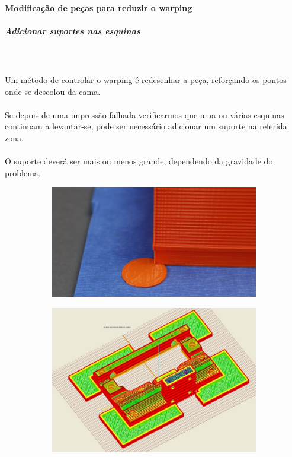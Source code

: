 \documentclass[11pt,a4paper]{article}
\begin{document}
			\paragraph{Modificação de peças para reduzir o warping}
				\subparagraph{Adicionar suportes nas esquinas}\mbox{}\\\\
Um método de controlar o warping é redesenhar a peça, reforçando os pontos onde se descolou da cama.
\\\\
Se depois de uma impressão falhada verificarmos que uma ou várias esquinas continuam a levantar-se, pode ser necessário adicionar um suporte na referida zona.
\\\\
O suporte deverá ser mais ou menos grande, dependendo da gravidade do problema.
\begin{figure}[H]
    \centering
    \begin{subfigure}[b]{0.4\textwidth}
        \includegraphics[width=\textwidth,cfbox=azul_marcos 4pt 0pt]{FOTOS/MOUSEEAR1}
    \end{subfigure}
    \qquad %
    \begin{subfigure}[b]{0.4\textwidth}
        \includegraphics[width=\textwidth,cfbox=azul_marcos 4pt 0pt]{FOTOS/MOUSEEAR2}
    \end{subfigure}   
\end{figure}	
\end{document}
